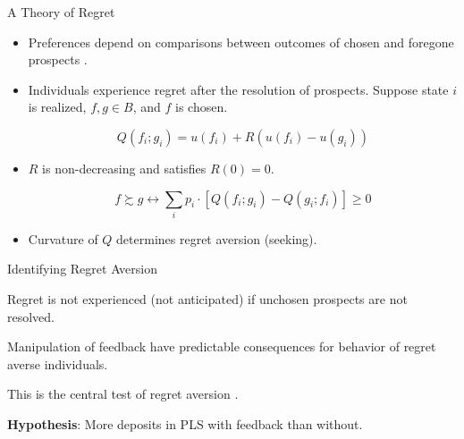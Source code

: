 \documentclass[aspectratio=169]{beamer}
\newenvironment{wideitemize}{\itemize\addtolength{\itemsep}{10pt}}{\enditemize}
\begin{document}
\begin{frame}{A Theory of Regret}

	\begin{itemize}

		\item Preferences depend on comparisons between outcomes of chosen and foregone prospects \parencite{bell_risk_1983,loomes_regret_1982}.

		\item Individuals experience regret after the resolution of prospects. Suppose state $i$ is realized, $f, g \in B$, and $f$ is chosen.

			\[ Q(f_i; g_i) = u(f_i) + R(u(f_i) - u(g_i)) \]

		\item $R$ is non-decreasing and satisfies $R(0) = 0$.

		\[ f \succsim g \leftrightarrow \sum_i p_{i} \cdot [Q(f_i; g_i) - Q(g_i; f_i)] \geq 0 \]

		\item Curvature of $Q$ determines regret aversion (seeking).

	\end{itemize}
	
\end{frame}

\begin{frame}{Identifying Regret Aversion}

	\begin{wideitemize}

		\item Regret is not experienced (not anticipated) if unchosen prospects are not resolved.


		\item Manipulation of feedback have predictable consequences for behavior of regret averse individuals.


		\item This is the central test of regret aversion \parencite{filiz-ozbay_auctions_2007,zeelenberg_consequences_2004,zeelenberg_consequences_1996}.

		\item \textbf{Hypothesis}: More deposits in PLS with feedback than without.

	\end{wideitemize}

\end{frame}
\end{document}
